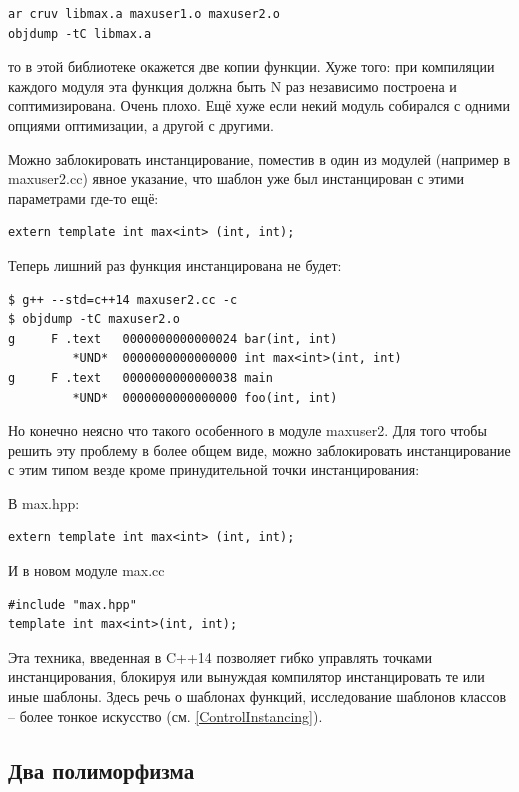 \documentclass[a4paper,12pt,oneside]{article}
\begin{document}
\begin{verbatim}
ar cruv libmax.a maxuser1.o maxuser2.o
objdump -tC libmax.a
\end{verbatim}

то в этой библиотеке окажется две копии функции. Хуже того: при компиляции каждого модуля эта функция должна быть N раз независимо построена и соптимизирована. Очень плохо. Ещё хуже если некий модуль собирался с одними опциями оптимизации, а другой с другими.

Можно заблокировать инстанцирование, поместив в один из модулей (например в maxuser2.cc) явное указание, что шаблон уже был инстанцирован с этими параметрами где-то ещё:

\begin{lstlisting}
extern template int max<int> (int, int);
\end{lstlisting}

Теперь лишний раз функция инстанцирована не будет:

\begin{verbatim}
$ g++ --std=c++14 maxuser2.cc -c
$ objdump -tC maxuser2.o
g     F .text	0000000000000024 bar(int, int)
         *UND*	0000000000000000 int max<int>(int, int)
g     F .text	0000000000000038 main
         *UND*	0000000000000000 foo(int, int)
\end{verbatim}

Но конечно неясно что такого особенного в модуле maxuser2. Для того чтобы решить эту проблему в более общем виде, можно заблокировать инстанцирование с этим типом везде кроме принудительной точки инстанцирования:

В max.hpp:

\begin{lstlisting}
extern template int max<int> (int, int);
\end{lstlisting}

И в новом модуле max.cc

\begin{lstlisting}
#include "max.hpp"
template int max<int>(int, int);
\end{lstlisting}

Эта техника, введенная в C++14 позволяет гибко управлять точками инстанцирования, блокируя или вынуждая компилятор инстанцировать те или иные шаблоны. Здесь речь о шаблонах функций, исследование шаблонов классов -- более тонкое искусство (см. \ref{ControlInstancing}).

\subsection{Два полиморфизма}\label{TemplatePolymorphism}
\end{document}
